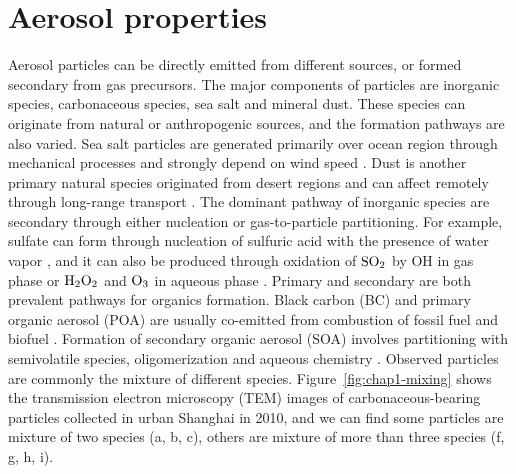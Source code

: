 \documentclass[edeposit,fullpage]{uiucthesis2009}
\begin{document}
\section{Aerosol properties}
\label{cha1-1:aerosol-defi}
Aerosol particles can be directly emitted from different sources, or formed secondary from gas precursors. The major components of particles are inorganic species, carbonaceous species, sea salt and mineral dust. These species can originate from natural or anthropogenic sources, and the formation pathways are also varied. Sea salt particles are generated primarily over ocean region through mechanical processes and strongly depend on wind speed \citep{jaegle2011global, monahan1986model}. Dust is another primary natural species originated from desert regions and can affect remotely through long-range transport \citep{van2018mysterious,yu2021observation}. The dominant pathway of inorganic species are secondary through either nucleation or gas-to-particle partitioning. For example, sulfate can form through nucleation of sulfuric acid with the presence of water vapor \citep{sipila2010role}, and it can also be produced through oxidation of $\rm SO_2$ by OH in gas phase or $\rm H_2O_2$ and $\rm O_3$ in aqueous phase \citep{shao2019heterogeneous, zheng2020multiphase}. Primary and secondary are both prevalent pathways for organics formation. Black carbon (BC) and primary organic aerosol (POA) are usually co-emitted from combustion of fossil fuel and biofuel \citep{bond2007historical}. Formation of secondary organic aerosol (SOA) involves partitioning with semivolatile species, oligomerization and aqueous chemistry \citep{zhu2017mechanism, lim2010aqueous, griffin2013sources, mcneill2015aqueous}. Observed particles are commonly the mixture of different species. 
Figure~\ref{fig:chap1-mixing} shows the transmission electron microscopy (TEM) images of carbonaceous-bearing particles collected in urban Shanghai in 2010, and we can find some particles are mixture of two species (a, b, c), others are mixture of more than three species (f, g, h, i).  
\end{document}
